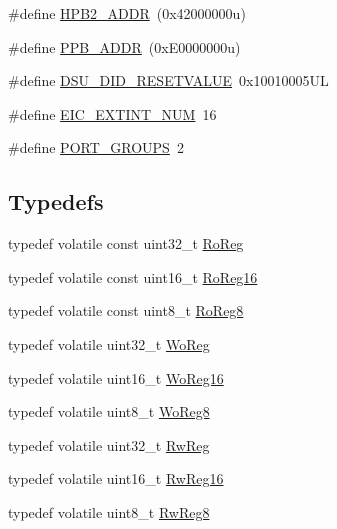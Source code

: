 \begin{DoxyCompactItemize}
\item 
\#define \mbox{\hyperlink{group___s_a_m_d21_g18_a__definitions_gaef42fa53ddf169a2a50be70d29f73571}{H\+P\+B2\+\_\+\+A\+D\+DR}}~(0x42000000u)
\item 
\#define \mbox{\hyperlink{group___s_a_m_d21_g18_a__definitions_ga8895d0a3a9a3126cc44330f86c8ce564}{P\+P\+B\+\_\+\+A\+D\+DR}}~(0x\+E0000000u)
\item 
\#define \mbox{\hyperlink{group___s_a_m_d21_g18_a__definitions_gada75131d542c9e1966238f5488f89bd6}{D\+S\+U\+\_\+\+D\+I\+D\+\_\+\+R\+E\+S\+E\+T\+V\+A\+L\+UE}}~0x10010005\+UL
\item 
\#define \mbox{\hyperlink{group___s_a_m_d21_g18_a__definitions_ga88ebc38c95506296f5d21f82476296ae}{E\+I\+C\+\_\+\+E\+X\+T\+I\+N\+T\+\_\+\+N\+UM}}~16
\item 
\#define \mbox{\hyperlink{group___s_a_m_d21_g18_a__definitions_gab9243ffe03a1dc631b57a495b4b3d467}{P\+O\+R\+T\+\_\+\+G\+R\+O\+U\+PS}}~2
\end{DoxyCompactItemize}
\subsection*{Typedefs}
\begin{DoxyCompactItemize}
\item 
typedef volatile const uint32\+\_\+t \mbox{\hyperlink{group___s_a_m_d21_g18_a__definitions_ga5d556f8391af4141be23f7334ac9dd68}{Ro\+Reg}}
\item 
typedef volatile const uint16\+\_\+t \mbox{\hyperlink{group___s_a_m_d21_g18_a__definitions_gaebf6e33c2d49a802e06e22a95ea9d0d0}{Ro\+Reg16}}
\item 
typedef volatile const uint8\+\_\+t \mbox{\hyperlink{group___s_a_m_d21_g18_a__definitions_ga0d957f1433aaf5d70e4dc2b68288442d}{Ro\+Reg8}}
\item 
typedef volatile uint32\+\_\+t \mbox{\hyperlink{group___s_a_m_d21_g18_a__definitions_gac0f96d4e8018367b38f527007cf0eafd}{Wo\+Reg}}
\item 
typedef volatile uint16\+\_\+t \mbox{\hyperlink{group___s_a_m_d21_g18_a__definitions_ga0ab0e5f6c8301aa1c2068e511d854094}{Wo\+Reg16}}
\item 
typedef volatile uint8\+\_\+t \mbox{\hyperlink{group___s_a_m_d21_g18_a__definitions_ga5e336e5a36ee12ebeafb021108e5275b}{Wo\+Reg8}}
\item 
typedef volatile uint32\+\_\+t \mbox{\hyperlink{group___s_a_m_d21_g18_a__definitions_gacf1496e3bbe303e55f627fc7558a68c7}{Rw\+Reg}}
\item 
typedef volatile uint16\+\_\+t \mbox{\hyperlink{group___s_a_m_d21_g18_a__definitions_gacce07556c80fc352ae607f225f19fed5}{Rw\+Reg16}}
\item 
typedef volatile uint8\+\_\+t \mbox{\hyperlink{group___s_a_m_d21_g18_a__definitions_gae361754be775bb192f85821d3ab33c17}{Rw\+Reg8}}
\end{DoxyCompactItemize}


